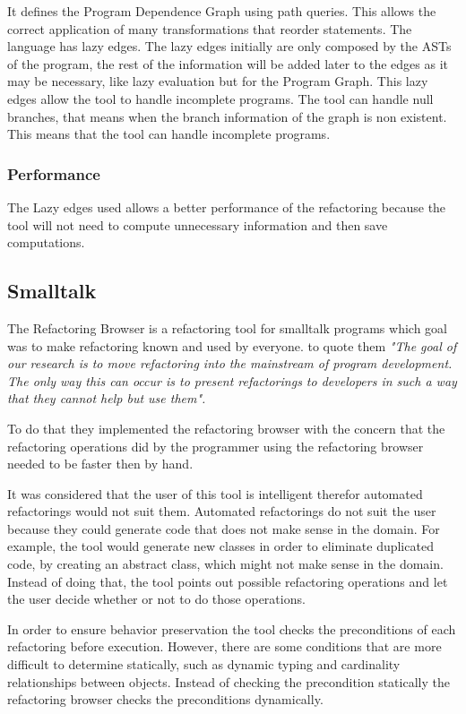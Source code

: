 It defines the Program Dependence Graph using path queries. 
This allows the correct application of many transformations that reorder statements.
The language has lazy edges. 
The lazy edges initially are only composed by the ASTs of the program, the rest of the information will be added later to the edges as it may be necessary, like lazy evaluation but for the Program Graph.
This lazy edges allow the tool to handle incomplete programs. 
The tool can handle null branches, that means when the branch information of the graph is non existent. This means that the tool can handle incomplete programs.

\subsubsection{Performance}

The Lazy edges used allows a better performance of the refactoring because the tool will not need to compute unnecessary information and then save computations.


\subsection{Smalltalk}%

The Refactoring Browser \cite{roberts1997refactoring} is a refactoring tool for smalltalk programs which goal was to make refactoring known and used by everyone.
to quote them  \textit{"The goal of our research is to move refactoring into the mainstream of program development. The only way this can occur is to present refactorings to developers in such a way that they cannot help but use them".} 

To do that they implemented the refactoring browser with the concern that the refactoring operations did by the programmer using the refactoring browser needed to be faster then by hand.

It was considered that the user of this tool is intelligent therefor automated refactorings would not suit them. 
Automated refactorings do not suit the user because they could generate code that does not make sense in the domain.
For example, the tool would generate new classes in order to eliminate duplicated code, by creating an abstract class, which might not make sense in the domain. Instead of doing that, the tool points out possible refactoring operations and let the user decide whether or not to do those operations.

In order to ensure behavior preservation the tool checks the preconditions of each refactoring before execution. 
However, there are some conditions that are more difficult to determine statically, such as dynamic typing and cardinality relationships between objects. 
Instead of checking the precondition statically the refactoring browser checks the preconditions dynamically. 

